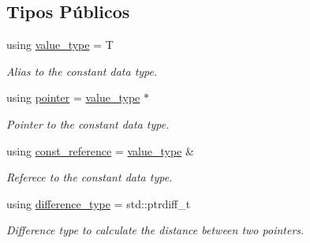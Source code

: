 \subsection*{Tipos Públicos}
\begin{DoxyCompactItemize}
\item 
\mbox{\label{classls_1_1my__const__iterator_aa7aa8489a065e4ddda33727d33c84b7d}} 
using \hyperlink{classls_1_1my__const__iterator_aa7aa8489a065e4ddda33727d33c84b7d}{value\+\_\+type} = T
\begin{DoxyCompactList}\small\item\em Alias to the constant data type. \end{DoxyCompactList}\item 
\mbox{\label{classls_1_1my__const__iterator_aef920ed4e39e8680046437ad8d898d78}} 
using \hyperlink{classls_1_1my__const__iterator_aef920ed4e39e8680046437ad8d898d78}{pointer} = \hyperlink{classls_1_1my__const__iterator_aa7aa8489a065e4ddda33727d33c84b7d}{value\+\_\+type} $\ast$
\begin{DoxyCompactList}\small\item\em Pointer to the constant data type. \end{DoxyCompactList}\item 
\mbox{\label{classls_1_1my__const__iterator_a47552bc9ef18669651047b1741c7ed42}} 
using \hyperlink{classls_1_1my__const__iterator_a47552bc9ef18669651047b1741c7ed42}{const\+\_\+reference} = \hyperlink{classls_1_1my__const__iterator_aa7aa8489a065e4ddda33727d33c84b7d}{value\+\_\+type} \&
\begin{DoxyCompactList}\small\item\em Referece to the constant data type. \end{DoxyCompactList}\item 
\mbox{\label{classls_1_1my__const__iterator_a1808102357aa1f98d3da0ebccbb9e767}} 
using \hyperlink{classls_1_1my__const__iterator_a1808102357aa1f98d3da0ebccbb9e767}{difference\+\_\+type} = std\+::ptrdiff\+\_\+t
\begin{DoxyCompactList}\small\item\em Difference type to calculate the distance between two pointers. \end{DoxyCompactList}\end{DoxyCompactItemize}
